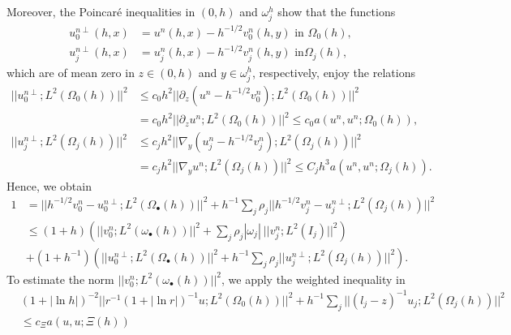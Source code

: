 \documentclass[11pt]{article}%
\numberwithin{equation}{section}
\begin{document}
Moreover, the Poincar\'{e} inequalities in $(0,h)$ and $\omega_{j}^{h}$ show
that the functions%
\begin{align*}
u_{0}^{n\perp}(h,x)  &  =u^{n}(h,x)-h^{-1/2}v_{0}^{n}(h,y)\text{\ \ in }%
\Omega_{0}(h),\\
u_{j}^{n\perp}(h,x)  &  =u_{j}^{n}(h,x)-h^{-1/2}v_{j}^{n}(h,y)\text{\ \ in
}\Omega_{j}(h),
\end{align*}
which are of mean zero in $z\in(0,h)$ and $y\in\omega_{j}^{h}$, respectively,
enjoy the relations%
\begin{align}
||u_{0}^{n\perp};L^{2}(\Omega_{0}(h))||^{2}  &  \leq c_{0}h^{2}||\partial
_{z}(u^{n}-h^{-1/2}v_{0}^{n});L^{2}(\Omega_{0}(h))||^{2}\label{R6}\\
&  =c_{0}h^{2}||\partial_{z}u^{n};L^{2}(\Omega_{0}(h))||^{2}\leq c_{0}%
a(u^{n},u^{n};\Omega_{0}(h)),\nonumber\\
||u_{j}^{n\perp};L^{2}(\Omega_{j}(h))||^{2}  &  \leq c_{j}h^{2}||\nabla
_{y}(u_{j}^{n}-h^{-1/2}v_{j}^{n});L^{2}(\Omega_{j}(h))||^{2}\nonumber\\
&  =c_{j}h^{2}||\nabla_{y}u^{n};L^{2}(\Omega_{j}(h))||^{2}\leq C_{j}%
h^{3}a(u^{n},u^{n};\Omega_{j}(h)).\nonumber
\end{align}
Hence, we obtain%
\begin{align}
1  &  =||h^{-1/2}v_{0}^{n}-u_{0}^{n\perp};L^{2}(\Omega_{\bullet}%
(h))||^{2}+h^{-1}%
{\textstyle\sum\nolimits_{j}}
\rho_{j}||h^{-1/2}v_{j}^{n}-u_{j}^{n\perp};L^{2}(\Omega_{j}(h))||^{2}%
\label{R7}\\
&  \leq(1+h)(||v_{0}^{n};L^{2}(\omega_{\bullet}(h))||^{2}+%
{\textstyle\sum\nolimits_{j}}
\rho_{j}|\omega_{j}|~||v_{j}^{n};L^{2}(I_{j})||^{2})\nonumber\\
&  +(1+h^{-1})(||u_{0}^{n\perp};L^{2}(\Omega_{\bullet}(h))||^{2}+h^{-1}%
{\textstyle\sum\nolimits_{j}}
\rho_{j}||u_{j}^{n\perp};L^{2}(\Omega_{j}(h))||^{2}).\nonumber
\end{align}
To estimate the norm $||v_{0}^{n};L^{2}(\omega_{\bullet}(h))||^{2}$, we apply
the weighted inequality in \cite[Thm. 9]{BuCaNa1}%
\begin{align}
&  (1+|\ln h|)^{-2}||r^{-1}(1+|\ln r|)^{-1}u;L^{2}(\Omega_{0}(h))||^{2}+h^{-1}%
{\textstyle\sum\nolimits_{j}}
||(l_{j}-z)^{-1}u_{j};L^{2}(\Omega_{j}(h))||^{2}\label{R8}\\
&  \leq c_{\Xi}a(u,u;\Xi(h))\nonumber
\end{align}
\end{document}
